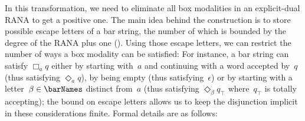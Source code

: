 \documentclass[10pt, final, conference, a4paper, twocolumn]{IEEEtran}
\begin{document}
In this transformation, we need to eliminate all box modalities in an
explicit-dual RANA to get a positive one. The main idea behind the
construction is to store possible escape letters of a bar string, the
number of which is bounded by the degree of the RANA plus one
(). Using those escape letters, we can
restrict the number of ways a box modality can be satisfied: For
instance, a bar string can satisfy $\Box_a q$ either by starting
with~$a$ and continuing with a word accepted by~$q$ (thus satisfying
$\Diamond_a q$), by being empty (thus satisfying~$\epsilon$) or by
starting with a letter~$\beta\in\barNames$ distinct from~$a$ (thus
satisfying $\Diamond_\beta q_\top$ where~$q_\top$ is totally
accepting); the bound on escape letters allows us to keep the
disjunction implicit in these considerations finite. Formal details
are as follows:
\end{document}
